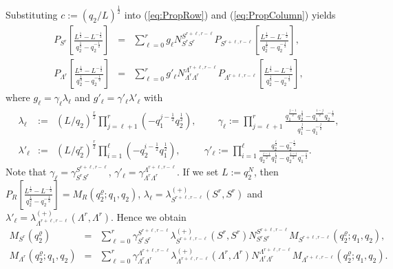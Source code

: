 \documentclass[hyper,letterpaper]{JHEP3}
\begin{document}
Substituting $c:=(q_2/L)^{\frac{1}{2}}$ into
(\ref{eq:PropRow}) and
(\ref{eq:PropColumn})
yields %
\begin{eqnarray}
P_{S^r}
\left[ \frac{L^{\frac{1}{2}}-L^{-\frac{1}{2}}}{q_2^{\frac{1}{2}}-q_2^{-\frac{1}{2}}} \right]
&=&
\sum_{\ell=0}^r
g_{\ell}
N_{S^rS^r}^{S^{r+\ell,r-\ell}}
P_{S^{r+\ell,r-\ell}}
\left[ \frac{L^{\frac{1}{2}}-L^{-\frac{1}{2}}}{q_2^{\frac{1}{2}}-q_2^{-\frac{1}{2}}} \right]
,
\\
P_{\Lambda^r}
\left[ \frac{L^{\frac{1}{2}}-L^{-\frac{1}{2}}}{q_2^{\frac{1}{2}}-q_2^{-\frac{1}{2}}} \right]
&=&
\sum_{\ell=0}^r
g'_{\ell}
N_{\Lambda^r\Lambda^r}^{\Lambda^{r+\ell,r-\ell}}
P_{\Lambda^{r+\ell,r-\ell}}
\left[ \frac{L^{\frac{1}{2}}-L^{-\frac{1}{2}}}{q_2^{\frac{1}{2}}-q_2^{-\frac{1}{2}}} \right]
,
\end{eqnarray}
where $g_\ell = \gamma_\ell \lambda_\ell$
and
$g'_\ell = \gamma'_\ell \lambda'_\ell $
with
\begin{eqnarray}
\lambda_\ell
&:=&
(L/q_2)^{\frac{r}{2}}
\prod_{j=\ell+1}^{r}
(-q_1^{j-\frac{1}{2}}q_2^{\frac{1}{2}})
,
\qquad
~
\gamma_\ell
:=
\prod_{j=\ell+1}^{r}
\frac{ q_1^{\frac{j-1}{2}}q_2^{\frac{1}{2}} - q_1^{\frac{1-j}{2}}q_2^{-\frac{1}{2}}}{ q_1^{\frac{j}{2}}-q_1^{-\frac{j}{2}}}
,
\\
\lambda'_\ell
&:=&
(L/q_2^r)^{\frac{r}{2}}
\prod_{i=1}^\ell
(-q_2^{i-\frac{1}{2}}q_1^{\frac{1}{2}})
,
\qquad~~
\gamma'_\ell
:=
\prod_{i=1}^\ell
\frac{
q_2^{\frac{i}{2}}-q_2^{-\frac{i}{2}}
}{
q_2^{\frac{i-1}{2}}q_1^{\frac{1}{2}} - q_2^{\frac{1-i}{2}}q_1^{-\frac{1}{2}}
}
.
\end{eqnarray}
Note that
$\gamma_\ell =
\gamma_{S^rS^r}^{S^{r+\ell,r-\ell}}$,
$\gamma'_\ell =
\gamma_{\Lambda^r\Lambda^r}^{\Lambda^{r+\ell,r-\ell}}$.
If we set $L:=q_2^{N}$, then
$P_R
\left[ \frac{L^{\frac{1}{2}}-L^{-\frac{1}{2}}}{q_2^{\frac{1}{2}}-q_2^{-\frac{1}{2}}} \right]
=
M_R(q_2^{\varrho};q_1,q_2)$,
$\lambda_\ell=\lambda^{(+)}_{S^{r+\ell,r-\ell}}(S^r,S^r)$ and
$\lambda'_\ell=\lambda^{(+)}_{\Lambda^{r+\ell,r-\ell}}(\Lambda^r,\Lambda^r)$.
Hence we obtain %
\begin{eqnarray}
M_{S^r}(q_2^{\varrho})
&=&
\sum_{\ell=0}^r
\gamma_{S^rS^r}^{S^{r+\ell,r-\ell}}
\lambda^{(+)}_{S^{r+\ell,r-\ell}}(S^r,S^r)
N_{S^rS^r}^{S^{r+\ell,r-\ell}}
M_{S^{r+\ell,r-\ell}}(q_2^{\varrho};q_1,q_2)
,
\\
M_{\Lambda^r}(q_2^{\varrho};q_1,q_2)
&=&
\sum_{\ell=0}^r
\gamma_{\Lambda^r\Lambda^r}^{\Lambda^{r+\ell,r-\ell}}
\lambda^{(+)}_{\Lambda^{r+\ell,r-\ell}}(\Lambda^r,\Lambda^r)
N_{\Lambda^r\Lambda^r}^{\Lambda^{r+\ell,r-\ell}}
M_{\Lambda^{r+\ell,r-\ell}}(q_2^{\varrho};q_1,q_2)
.
\end{eqnarray}
\end{document}
